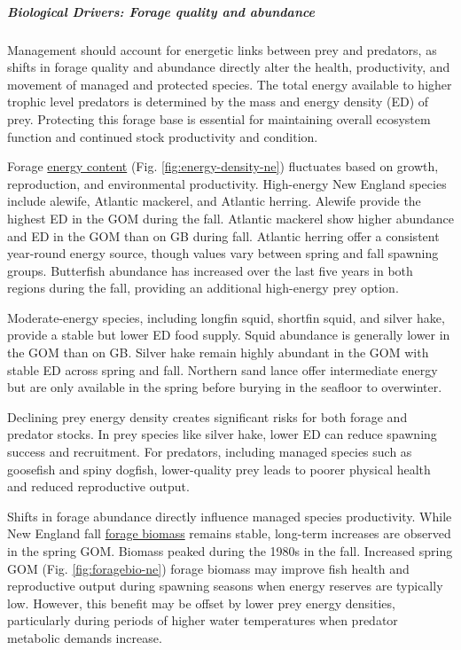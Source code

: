 \documentclass[
  10pt,
]{article}
\begin{document}
\subparagraph{Biological Drivers: Forage quality and abundance}\label{biological-drivers-forage-quality-and-abundance}

Management should account for energetic links between prey and predators, as shifts in forage quality and abundance directly alter the health, productivity, and movement of managed and protected species. The total energy available to higher trophic level predators is determined by the mass and energy density (ED) of prey. Protecting this forage base is essential for maintaining overall ecosystem function and continued stock productivity and condition.

Forage \href{https://noaa-edab.github.io/catalog/energy_density.html}{energy content} (Fig. \ref{fig:energy-density-ne}) fluctuates based on growth, reproduction, and environmental productivity. High-energy New England species include alewife, Atlantic mackerel, and Atlantic herring. Alewife provide the highest ED in the GOM during the fall. Atlantic mackerel show higher abundance and ED in the GOM than on GB during fall. Atlantic herring offer a consistent year-round energy source, though values vary between spring and fall spawning groups. Butterfish abundance has increased over the last five years in both regions during the fall, providing an additional high-energy prey option.

Moderate-energy species, including longfin squid, shortfin squid, and silver hake, provide a stable but lower ED food supply. Squid abundance is generally lower in the GOM than on GB. Silver hake remain highly abundant in the GOM with stable ED across spring and fall. Northern sand lance offer intermediate energy but are only available in the spring before burying in the seafloor to overwinter.

Declining prey energy density creates significant risks for both forage and predator stocks. In prey species like silver hake, lower ED can reduce spawning success and recruitment. For predators, including managed species such as goosefish and spiny dogfish, lower-quality prey leads to poorer physical health and reduced reproductive output.

Shifts in forage abundance directly influence managed species productivity. While New England fall \href{https://noaa-edab.github.io/catalog/forage_index.html}{forage biomass} remains stable, long-term increases are observed in the spring GOM. Biomass peaked during the 1980s in the fall. Increased spring GOM (Fig. \ref{fig:foragebio-ne}) forage biomass may improve fish health and reproductive output during spawning seasons when energy reserves are typically low. However, this benefit may be offset by lower prey energy densities, particularly during periods of higher water temperatures when predator metabolic demands increase.
\end{document}
